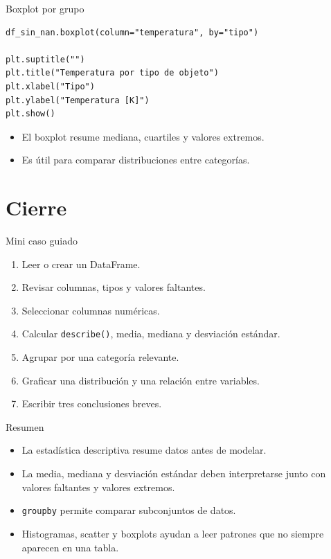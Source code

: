 \documentclass[10pt]{beamer}
\begin{document}
\begin{frame}[fragile]{Boxplot por grupo}
\begin{verbatim}
df_sin_nan.boxplot(column="temperatura", by="tipo")

plt.suptitle("")
plt.title("Temperatura por tipo de objeto")
plt.xlabel("Tipo")
plt.ylabel("Temperatura [K]")
plt.show()
\end{verbatim}

  \begin{itemize}
    \item El boxplot resume mediana, cuartiles y valores extremos.
    \item Es útil para comparar distribuciones entre categorías.
  \end{itemize}
\end{frame}

\section{Cierre}

\begin{frame}{Mini caso guiado}
  \begin{enumerate}
    \item Leer o crear un DataFrame.
    \item Revisar columnas, tipos y valores faltantes.
    \item Seleccionar columnas numéricas.
    \item Calcular \texttt{describe()}, media, mediana y desviación estándar.
    \item Agrupar por una categoría relevante.
    \item Graficar una distribución y una relación entre variables.
    \item Escribir tres conclusiones breves.
  \end{enumerate}
\end{frame}

\begin{frame}{Resumen}
  \begin{itemize}
    \item La estadística descriptiva resume datos antes de modelar.
    \item La media, mediana y desviación estándar deben interpretarse junto con valores faltantes y valores extremos.
    \item \texttt{groupby} permite comparar subconjuntos de datos.
    \item Histogramas, scatter y boxplots ayudan a leer patrones que no siempre aparecen en una tabla.
  \end{itemize}
\end{frame}
\end{document}
